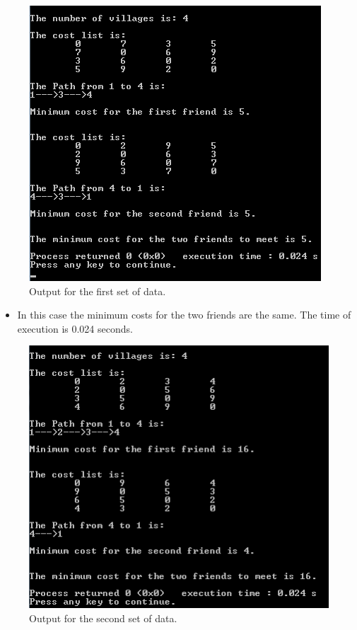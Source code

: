 \documentclass{article}
\begin{document}
\begin{figure}[h!]
\centering
\includegraphics[scale=0.5]{secondexample.png}
\caption{Output for the first set of data.}
\label{fig:crypt}
\end{figure}
\begin{itemize}
    \item In this case the minimum costs for the two friends are the same. The time of execution is 0.024 seconds.\\
\end{itemize}
\begin{figure}[h!]
\centering
\includegraphics[scale=0.5]{firstexample.png}
\caption{Output for the second set of data.}
\label{fig:crypt}
\end{figure}
\end{document}
